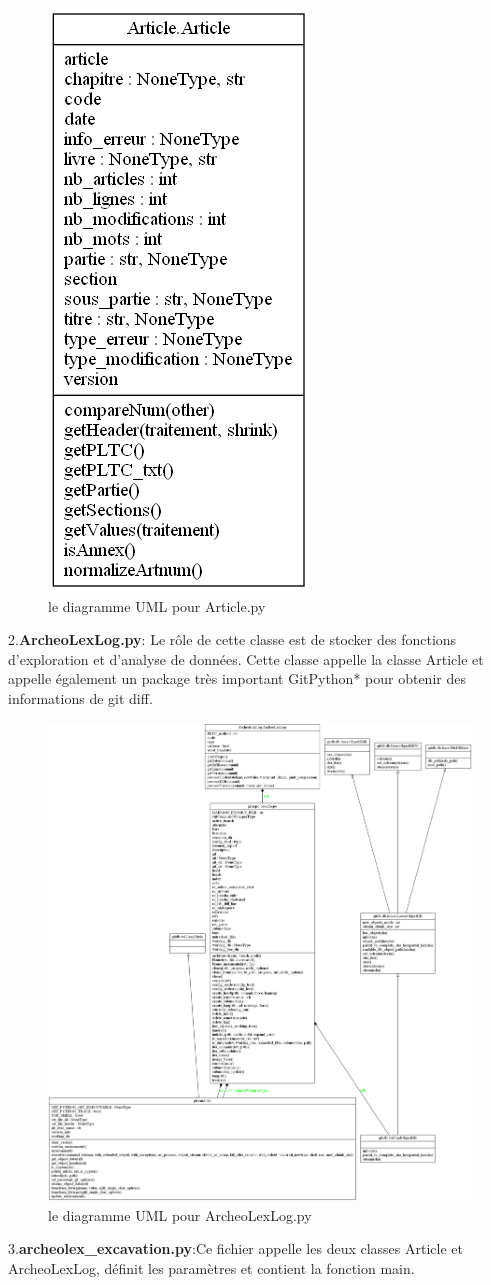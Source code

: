 \documentclass[
  oneside]{book}
\begin{document}
\begin{figure}

{\centering \includegraphics[width=0.25\linewidth]{images/Article_UML} 

}

\caption{le diagramme UML pour Article.py}\label{fig:Article}
\end{figure}

2.\textbf{ArcheoLexLog.py}:
Le rôle de cette classe est de stocker des fonctions d'exploration et d'analyse de données. Cette classe appelle la classe Article et appelle également un package très important GitPython* pour obtenir des informations de git diff.

\begin{figure}

{\centering \includegraphics[width=0.5\linewidth]{images/ArcheoLexLog_UML} 

}

\caption{le diagramme UML pour ArcheoLexLog.py}\label{fig:ArcheoLexLog}
\end{figure}

3.\textbf{archeolex\_excavation.py}:Ce fichier appelle les deux classes Article et ArcheoLexLog, définit les paramètres et contient la fonction main.
\end{document}
